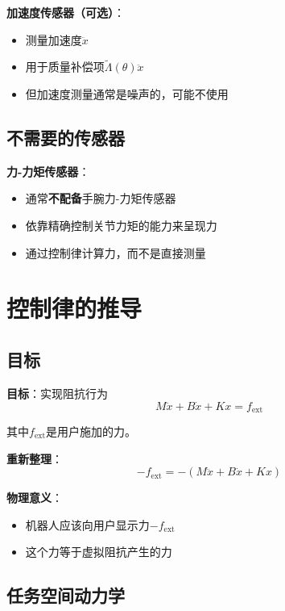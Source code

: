 \documentclass[12pt,a4paper]{article}
\begin{document}
\textbf{加速度传感器（可选）}：
\begin{itemize}
\item 测量加速度$\ddot{x}$
\item 用于质量补偿项$\tilde{\Lambda}(\theta)\ddot{x}$
\item 但加速度测量通常是噪声的，可能不使用
\end{itemize}

\subsection{不需要的传感器}

\textbf{力-力矩传感器}：
\begin{itemize}
\item 通常\textbf{不配备}手腕力-力矩传感器
\item 依靠精确控制关节力矩的能力来呈现力
\item 通过控制律计算力，而不是直接测量
\end{itemize}

\section{控制律的推导}

\subsection{目标}

\textbf{目标}：实现阻抗行为
\begin{equation}
M\ddot{x} + B\dot{x} + Kx = f_{\text{ext}} \tag{11.64}
\end{equation}

其中$f_{\text{ext}}$是用户施加的力。

\textbf{重新整理}：
\begin{equation}
-f_{\text{ext}} = -(M\ddot{x} + B\dot{x} + Kx)
\end{equation}

\textbf{物理意义}：
\begin{itemize}
\item 机器人应该向用户显示力$-f_{\text{ext}}$
\item 这个力等于虚拟阻抗产生的力
\end{itemize}

\subsection{任务空间动力学}
\end{document}
